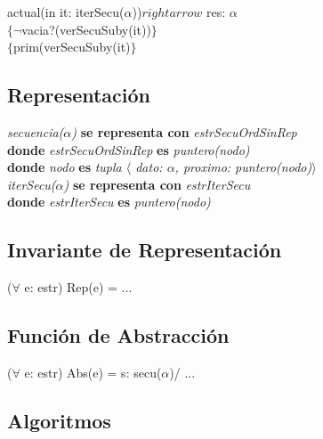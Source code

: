 actual(in it: iterSecu($\alpha$))$rightarrow$ res: $\alpha$\\
$\{\neg$vacia?(verSecuSuby(it))$\}$\\
$\{$prim(verSecuSuby(it)$\}$\\



\subsection*{Representaci\'on}
\textit{secuencia($\alpha$)} \textbf{se representa con} \textit{estrSecuOrdSinRep}\\
\textbf{donde} \textit{estrSecuOrdSinRep} \textbf{es} \textit{puntero(nodo)}\\
\textbf{donde} \textit{nodo} \textbf{es} \textit{tupla $\langle$ dato: $\alpha$, proximo: puntero(nodo)$\rangle$}\\

\textit{iterSecu($\alpha$)} \textbf{se representa con} \textit{estrIterSecu}\\
\textbf{donde} \textit{estrIterSecu} \textbf{es} \textit{puntero(nodo)}\\

\subsection*{Invariante de Representaci\'on}
\vspace{11pt}
($\forall$ e: estr) Rep(e) = ...
\vspace{33pt}

\subsection*{Funci\'on de Abstracci\'on}
\vspace{11pt}
($\forall$ e: estr) Abs(e) = s: secu($\alpha$)/ ...
\vspace{33pt}

\subsection*{Algoritmos}